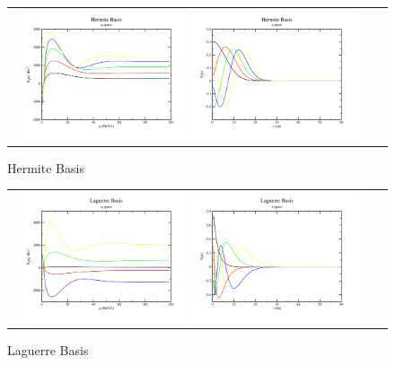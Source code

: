 \documentclass[aps,prl,twocolumn,floatfix,preprintnumbers,showpacs]{revtex4}
\begin{document}
\begin{figure}
\begin{tabular}{cc}        
\includegraphics[width=0.47\textwidth]{basis_function_plots/Hermite_Basis_q}    
\includegraphics[width=0.47\textwidth]{basis_function_plots/Hermite_Basis_r}    
\end{tabular}    
\caption{\label{Hermite} Hermite Basis}    
\end{figure}

\begin{figure}
\begin{tabular}{cc}        
\includegraphics[width=0.47\textwidth]{basis_function_plots/Laguerre_Basis_q}    
\includegraphics[width=0.47\textwidth]{basis_function_plots/Laguerre_Basis_r}    
\end{tabular}    
\caption{\label{Laguerre} Laguerre Basis}    
\end{figure}
\end{document}
